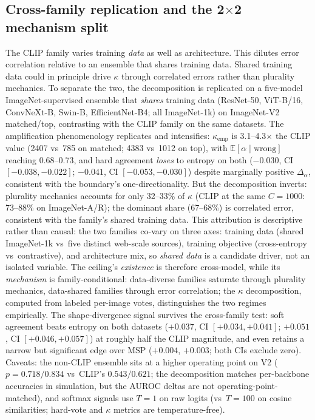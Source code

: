 \documentclass[a4paper,fleqn]{cas-sc}
\begin{document}
\subsection{Cross-family replication and the 2$\times$2 mechanism split}
\label{sec:nonclip}
The CLIP family varies training \emph{data} as well as architecture. This dilutes error correlation relative to an ensemble that shares training data. Shared training data could in principle drive $\kappa$ through correlated errors rather than plurality mechanics.
To separate the two, the decomposition is replicated on a five-model ImageNet-supervised ensemble that \emph{shares} training data (ResNet-50, ViT-B/16, ConvNeXt-B, Swin-B, EfficientNet-B4; all ImageNet-1k) on ImageNet-V2 matched/top, contrasting with the CLIP family on the same datasets.
The amplification phenomenology replicates and intensifies: $\kappa_{\text{emp}}$ is 3.1--4.3$\times$ the CLIP value (2407 vs~785 on matched; 4383 vs~1012 on top), with $\mathbb{E}[\alpha\mid\text{wrong}]$ reaching 0.68--0.73, and hard agreement \emph{loses} to entropy on both ($-0.030$, CI $[-0.038,-0.022]$; $-0.041$, CI $[-0.053,-0.030]$) despite marginally positive $\Delta_\alpha$, consistent with the boundary's one-directionality.
But the decomposition inverts: plurality mechanics accounts for only 32--33\% of $\kappa$ (CLIP at the same $C{=}1000$: 73--88\% on ImageNet-A/R); the dominant share (67--68\%) is correlated error, consistent with the family's shared training data.
This attribution is descriptive rather than causal: the two families co-vary on three axes: training data (shared ImageNet-1k vs~five distinct web-scale sources), training objective (cross-entropy vs~contrastive), and architecture mix, so \emph{shared data} is a candidate driver, not an isolated variable.
The ceiling's \emph{existence} is therefore cross-model, while its \emph{mechanism} is family-conditional: data-diverse families saturate through plurality mechanics, data-shared families through error correlation; the $\kappa$ decomposition, computed from labeled per-image votes, distinguishes the two regimes empirically.
The shape-divergence signal survives the cross-family test: soft agreement beats entropy on both datasets ($+0.037$, CI $[+0.034,+0.041]$; $+0.051$, CI $[+0.046,+0.057]$) at roughly half the CLIP magnitude, and even retains a narrow but significant edge over MSP ($+0.004$, $+0.003$; both CIs exclude zero).
Caveats: the non-CLIP ensemble sits at a higher operating point on V2 ($p{=}0.718/0.834$ vs~CLIP's $0.543/0.621$; the decomposition matches per-backbone accuracies in simulation, but the AUROC deltas are not operating-point-matched), and softmax signals use $T{=}1$ on raw logits (vs~$T{=}100$ on cosine similarities; hard-vote and $\kappa$ metrics are temperature-free).
\end{document}
